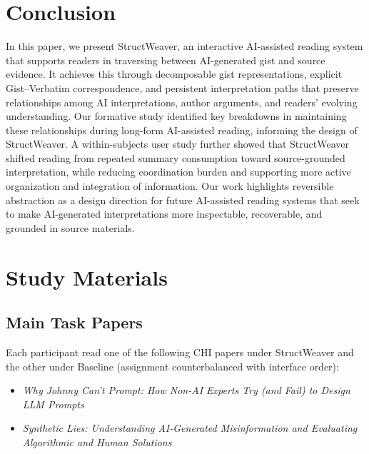 \documentclass[manuscript,review,anonymous]{acmart}
\begin{document}


\section{Conclusion}

In this paper, we present StructWeaver, an interactive AI-assisted reading system that supports readers in traversing between AI-generated gist and source evidence. It achieves this through decomposable gist representations, explicit Gist--Verbatim correspondence, and persistent interpretation paths that preserve relationships among AI interpretations, author arguments, and readers' evolving understanding. Our formative study identified key breakdowns in maintaining these relationships during long-form AI-assisted reading, informing the design of StructWeaver. A within-subjects user study further showed that StructWeaver shifted reading from repeated summary consumption toward source-grounded interpretation, while reducing coordination burden and supporting more active organization and integration of information. Our work highlights reversible abstraction as a design direction for future AI-assisted reading systems that seek to make AI-generated interpretations more inspectable, recoverable, and grounded in source materials.







\appendix

\section{Study Materials}
\label{appendix:study-materials}

\subsection{Main Task Papers}
Each participant read one of the following CHI papers under StructWeaver and the other under Baseline (assignment counterbalanced with interface order):
\begin{itemize}[leftmargin=*, noitemsep]
  \item \textit{Why Johnny Can't Prompt: How Non-AI Experts Try (and Fail) to Design LLM Prompts}~\cite{Zamfirescu-Pereira}
  \item \textit{Synthetic Lies: Understanding AI-Generated Misinformation and Evaluating Algorithmic and Human Solutions}~\cite{synthetic_lies}
\end{itemize}
\end{document}
